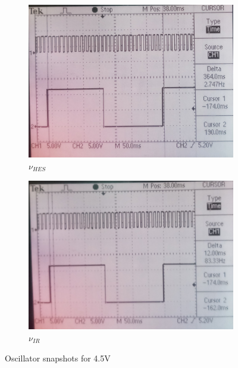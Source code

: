 \documentclass[12pt]{article}
\begin{document}
\begin{figure}[H]
	\begin{subfigure}[b]{0.5\linewidth}
		\includegraphics[width = \linewidth, trim = {0 0 0 0}, clip]{HES4_5V.jpg}
		\caption{\( \nu_{HES} \)}
	\end{subfigure}
	\begin{subfigure}[b]{0.5\linewidth}						
		\includegraphics[width = \linewidth, trim = {0 0 0 0}, clip]{IR4_5V.jpg}
		\caption{\( \nu_{IR} \)}
	\end{subfigure}
	\caption{Oscillator snapshots for 4.5V}
\end{figure}
\end{document}
